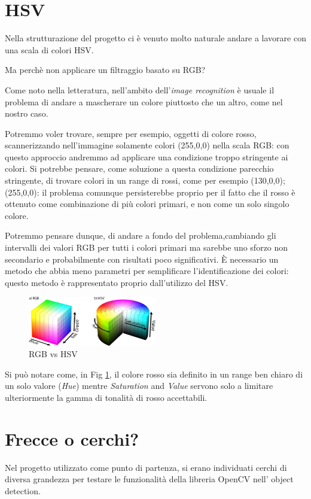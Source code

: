 \section{HSV}
Nella strutturazione del progetto ci è venuto molto naturale andare a lavorare con una scala di colori HSV.

Ma perchè non applicare un filtraggio basato su RGB?

Come noto nella letteratura, nell'ambito dell'\textit{image recognition} è usuale il problema di andare a mascherare un colore piuttosto che un altro, come nel nostro caso.

Potremmo voler trovare, sempre per esempio, oggetti di colore rosso, scannerizzando nell'immagine solamente colori (255,0,0) nella scala RGB: con questo approccio andremmo ad applicare una condizione troppo stringente ai colori.
Si potrebbe pensare, come soluzione a questa condizione parecchio stringente, di trovare colori in un range di rossi, come per esempio {(130,0,0);(255,0,0)}: il problema comunque persisterebbe proprio per il fatto che il rosso è ottenuto come combinazione di più colori primari, e non come un solo singolo colore.

Potremmo pensare dunque, di andare a fondo del problema,cambiando gli intervalli dei valori RGB per tutti i colori primari ma sarebbe uno sforzo non secondario e probabilmente con risultati poco significativi.
È necessario un metodo che abbia meno parametri per semplificare l'identificazione dei colori: questo metodo è rappresentato proprio dall'utilizzo del HSV.

\begin{figure}[H]
	\centering
	\includegraphics[width=0.5\textwidth]{Immagini/HSV_RGB.jpeg}
	\caption{RGB vs HSV}
	\label{fig:RGB_&_HSV}
\end{figure}

Si può notare come, in Fig \ref{fig:RGB_&_HSV}, il colore rosso sia definito in un range ben chiaro di un solo valore (\textit{Hue}) mentre \textit{Saturation }and \textit{Value} servono solo a limitare ulteriormente la gamma di tonalità di rosso accettabili. 

\section{Frecce o cerchi?}
Nel progetto utilizzato come punto di partenza, si erano individuati cerchi di diversa grandezza per testare le funzionalità della libreria OpenCV nell' object detection.

